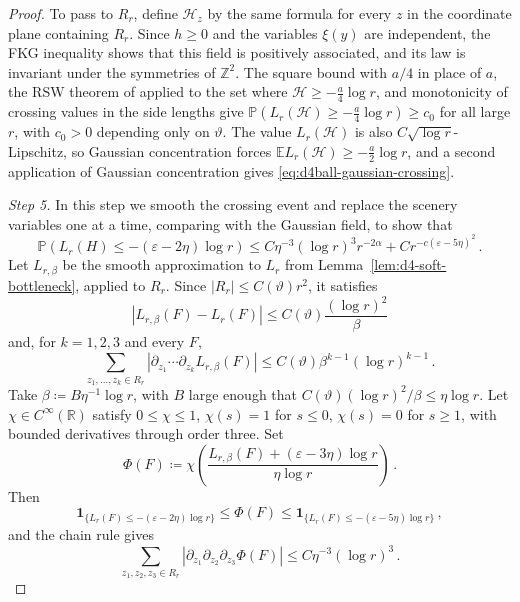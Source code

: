 \documentclass[11pt]{amsart}
\theoremstyle{plain}
\theoremstyle{definition}
\newcommand{\Z}{\mathbb{Z}}
\newcommand{\R}{\mathbb{R}}
\newcommand{\E}{\mathbb{E}}
\renewcommand{\P}{\mathbb{P}}
\newcommand{\one}{\mathbf{1}}
\begin{document}
\begin{proof}
To pass to $R_r$, define $\mathcal H_z$ by the same formula for every $z$ in
the coordinate plane containing $R_r$. Since $h\geq0$ and the variables
$\xi(y)$ are independent, the FKG inequality shows that this field is
positively associated, and its law is invariant under the symmetries of
$\Z^2$. The square bound with $a/4$ in place of $a$, the RSW theorem of
\citet[Theorem~1]{KohlerSchindlerTassion} applied to the set where
$\mathcal H\geq-\frac a4\log r$, and monotonicity of crossing values in
the side lengths give
$\P(L_r(\mathcal H)\geq-\frac a4\log r)\geq c_0$ for all large $r$, with
$c_0>0$ depending only on $\vartheta$. The value $L_r(\mathcal H)$ is also
$C\sqrt{\log r}$-Lipschitz, so Gaussian concentration forces
$\E L_r(\mathcal H)\geq-\frac a2\log r$, and a second application of
Gaussian concentration gives \eqref{eq:d4ball-gaussian-crossing}.

\smallskip
\noindent\emph{Step 5.} In this step we smooth the crossing event and replace the scenery variables one at a time, comparing with the Gaussian field,
to show that 
\begin{equation}\label{eq:d4ball-far-crossing}
    \P\left(L_r(H)\leq-(\varepsilon-2\eta)\log r\right)
    \leq
    C\eta^{-3}(\log r)^3r^{-2\alpha}
    +
    Cr^{-c(\varepsilon-5\eta)^2}\, .
\end{equation}
Let $L_{r,\beta}$ be the smooth approximation to $L_r$ from
Lemma~\ref{lem:d4-soft-bottleneck}, applied to $R_r$.
Since $|R_r|\leq C(\vartheta) r^2$, it satisfies
\[
    |L_{r,\beta}(F)-L_r(F)|\leq C(\vartheta)\frac{(\log r)^2}{\beta}
\]
and, for $k=1,2,3$ and every $F$,
\[
    \sum_{z_1,\ldots,z_k\in R_r}
    |\partial_{z_1}\cdots\partial_{z_k}L_{r,\beta}(F)|
    \leq C(\vartheta)\beta^{k-1}(\log r)^{k-1}\, .
\]
	Take $\beta\coloneqq B\eta^{-1}\log r$, with $B$ large enough that
	$C(\vartheta)(\log r)^2/\beta\leq\eta\log r$. Let
$\chi\in C^\infty(\R)$ satisfy $0\leq\chi\leq1$, $\chi(s)=1$ for
$s\leq0$, $\chi(s)=0$ for $s\geq1$, with bounded derivatives through
	order three. Set
	\[
		\Phi(F)\coloneqq
		\chi\left(
		\frac{L_{r,\beta}(F)+(\varepsilon-3\eta)\log r}{\eta\log r}
		\right)\, .
\]
Then
\begin{equation}\label{eq:d4ball-phi-comparison}
	\one_{\{L_r(F)\leq-(\varepsilon-2\eta)\log r\}}
	\leq \Phi(F)\leq
	\one_{\{L_r(F)\leq-(\varepsilon-5\eta)\log r\}}\, ,
\end{equation}
and the chain rule gives
\begin{equation}\label{eq:d4ball-phi-third}
    \sum_{z_1,z_2,z_3\in R_r}
    |\partial_{z_1}\partial_{z_2}\partial_{z_3}\Phi(F)|
    \leq C\eta^{-3}(\log r)^3\, .
\end{equation}


\end{proof}
\end{document}
